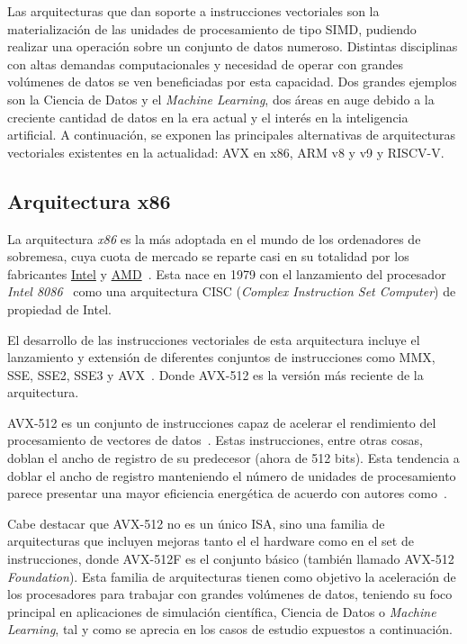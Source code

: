 Las arquitecturas que dan soporte a instrucciones vectoriales son la
materialización de las unidades de procesamiento de tipo SIMD, pudiendo
realizar una operación sobre un conjunto de datos numeroso. Distintas
disciplinas con altas demandas computacionales y necesidad de operar con
grandes volúmenes de datos se ven beneficiadas por esta capacidad. Dos grandes
ejemplos son la Ciencia de Datos y el \textit{Machine Learning}, dos áreas en
auge debido a la creciente cantidad de datos en la era actual y el interés en
la inteligencia artificial. A continuación, se exponen las principales
alternativas de arquitecturas vectoriales existentes en la actualidad: AVX en
x86, ARM v8 y v9 y RISCV-V.

\subsection{Arquitectura x86}
La arquitectura \textit{x86} es la más adoptada en el mundo de los ordenadores
de sobremesa, cuya cuota de mercado se reparte casi en su totalidad por los
fabricantes \href{https://www.intel.com}{Intel} y
\href{https://www.amd.com}{AMD}~\cite{tiwari2022amd}. Esta nace en 1979 con el
lanzamiento del procesador \textit{Intel 8086}~\cite{kogatambirth} como una
arquitectura CISC (\textit{Complex Instruction Set Computer}) de propiedad de
Intel.

El desarrollo de las instrucciones vectoriales de esta arquitectura incluye el
lanzamiento y extensión de diferentes conjuntos de instrucciones como MMX, SSE,
SSE2, SSE3 y AVX~\cite{vector_research}. Donde AVX-512 es la versión más
reciente de la arquitectura.

AVX-512 es un conjunto de instrucciones capaz de acelerar el rendimiento del
procesamiento de vectores de datos~\cite{intel-avx512}. Estas instrucciones,
entre otras cosas, doblan el ancho de registro de su predecesor (ahora de 512
bits). Esta tendencia a doblar el ancho de registro manteniendo el número de
unidades de procesamiento parece presentar una mayor eficiencia energética de
acuerdo con autores como~\cite{hennessy2011computer}.

Cabe destacar que AVX-512 no es un único ISA, sino una familia de arquitecturas
que incluyen mejoras tanto el el hardware como en el set de instrucciones,
donde AVX-512F es el conjunto básico (también llamado AVX-512
\textit{Foundation}). Esta familia de arquitecturas tienen como objetivo la
aceleración de los procesadores para trabajar con grandes volúmenes de datos,
teniendo su foco principal en aplicaciones de simulación científica, Ciencia de
Datos o \textit{Machine Learning}, tal y como se aprecia en los casos de
estudio expuestos a continuación.

